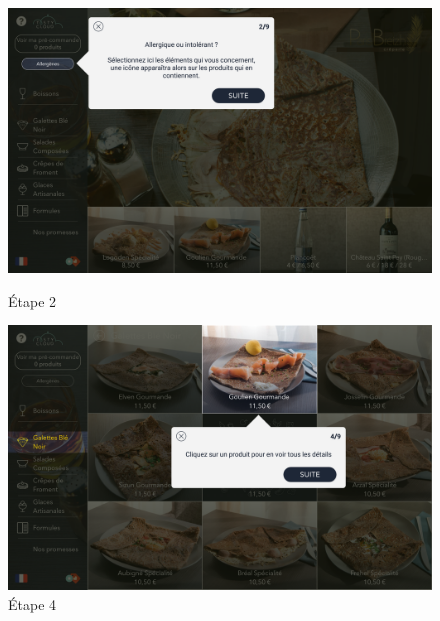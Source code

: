 \begin{figure}[!htb]
  \centering
  \begin{minipage}[b]{0.45\textwidth}
    \includegraphics[width=\textwidth]{images/tuto3.png}
    \caption{Étape 2}
  \end{minipage}
  \hfill
  \begin{minipage}[b]{0.45\textwidth}
    \includegraphics[width=\textwidth]{images/tuto4.png}
    \caption{Étape 4}
  \end{minipage}
\end{figure}

